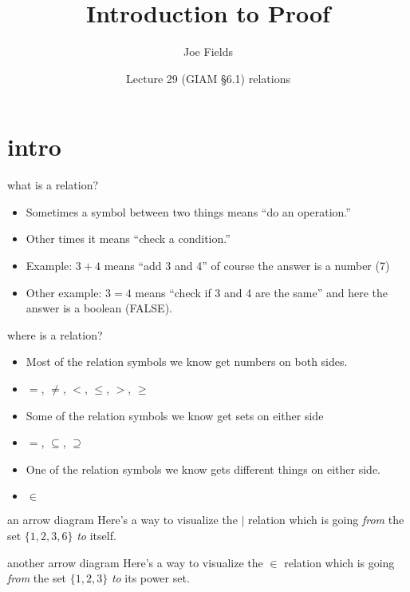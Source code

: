 \documentclass[handout,landscape]{beamer}
\author{Joe Fields}
\title{Introduction to Proof}
\date{Lecture 29 (GIAM \S 6.1) \newline relations}
\institute[SCSU]{ {\tt fieldsj1@southernct.edu} }
\begin{document}
\begin{frame}[plain]
  \titlepage
\end{frame}

\section{intro}

\begin{frame}{what is a relation?}
\begin{itemize}
\item Sometimes a symbol between two things means ``do an operation.'' \pause
\item Other times it means ``check a condition.'' \pause
\item Example: $3+4$ means ``add 3 and 4'' of course the answer is a number (7) \pause
\item Other example: $3=4$ means ``check if 3 and 4 are the same'' and here the answer is a boolean (FALSE).
\end{itemize}
\end{frame}

\begin{frame}{where is a relation?}
\begin{itemize}
\item Most of the relation symbols we know get numbers on both sides. \pause
\item $=$,  $\neq$, $<$, $\leq$, $>$, $\geq$ \pause
\item Some of the relation symbols we know get sets on either side \pause
\item $=$, $\subseteq$, $\supseteq$ \pause
\item One of the relation symbols we know gets different things on either side. \pause
\item $\in$
\end{itemize}
\end{frame}

\begin{frame}{an arrow diagram}
Here's a way to visualize the $\mid$ relation which is going {\em from} the set $\{1,2,3,6\}$ {\em to} itself. \pause

\begin{center}

\end{center}   
\end{frame}

\begin{frame}{another arrow diagram}
Here's a way to visualize the $\in$ relation which is going {\em from} the set $\{1,2,3\}$ {\em to} its power set. \pause

\begin{center}

\end{center}   
\end{frame}
\end{document}
